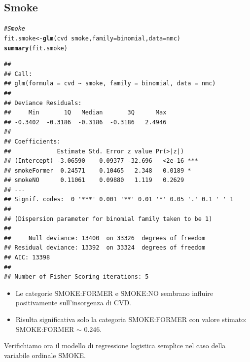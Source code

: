 \documentclass{article}\usepackage[]{graphicx}\usepackage[]{xcolor}
\makeatletter
\newcommand{\hlcom}[1]{\textcolor[rgb]{0.678,0.584,0.686}{\textit{#1}}}%
\newcommand{\hlopt}[1]{\textcolor[rgb]{0,0,0}{#1}}%
\newcommand{\hlstd}[1]{\textcolor[rgb]{0.345,0.345,0.345}{#1}}%
\newcommand{\hlkwb}[1]{\textcolor[rgb]{0.69,0.353,0.396}{#1}}%
\newcommand{\hlkwc}[1]{\textcolor[rgb]{0.333,0.667,0.333}{#1}}%
\newcommand{\hlkwd}[1]{\textcolor[rgb]{0.737,0.353,0.396}{\textbf{#1}}}%
\newenvironment{kframe}{%
 \def\at@end@of@kframe{}%
 \ifinner\ifhmode%
  \def\at@end@of@kframe{\end{minipage}}%
  \begin{minipage}{\columnwidth}%
 \fi\fi%
 \def\FrameCommand##1{\hskip\@totalleftmargin \hskip-\fboxsep
 \colorbox{shadecolor}{##1}\hskip-\fboxsep
     \hskip-\linewidth \hskip-\@totalleftmargin \hskip\columnwidth}%
 \MakeFramed {\advance\hsize-\width
   \@totalleftmargin\z@ \linewidth\hsize
   \@setminipage}}%
 {\par\unskip\endMakeFramed%
 \at@end@of@kframe}
\newenvironment{knitrout}{}{} %
\makeatother
\begin{document}
  \subsection{Smoke}  
\begin{knitrout}
\color{fgcolor}\begin{kframe}
\begin{alltt}
\hlcom{#Smoke}
\hlstd{fit.smoke} \hlkwb{<-} \hlkwd{glm}\hlstd{(cvd}\hlopt{~}\hlstd{smoke,} \hlkwc{family}\hlstd{=binomial,} \hlkwc{data}\hlstd{=nmc)}
\hlkwd{summary}\hlstd{(fit.smoke)}
\end{alltt}
\begin{verbatim}
## 
## Call:
## glm(formula = cvd ~ smoke, family = binomial, data = nmc)
## 
## Deviance Residuals: 
##     Min       1Q   Median       3Q      Max  
## -0.3402  -0.3186  -0.3186  -0.3186   2.4946  
## 
## Coefficients:
##             Estimate Std. Error z value Pr(>|z|)    
## (Intercept) -3.06590    0.09377 -32.696   <2e-16 ***
## smokeFormer  0.24571    0.10465   2.348   0.0189 *  
## smokeNO      0.11061    0.09880   1.119   0.2629    
## ---
## Signif. codes:  0 '***' 0.001 '**' 0.01 '*' 0.05 '.' 0.1 ' ' 1
## 
## (Dispersion parameter for binomial family taken to be 1)
## 
##     Null deviance: 13400  on 33326  degrees of freedom
## Residual deviance: 13392  on 33324  degrees of freedom
## AIC: 13398
## 
## Number of Fisher Scoring iterations: 5
\end{verbatim}
\end{kframe}
\end{knitrout}
  
    \begin{itemize}
      \item Le categorie SMOKE:FORMER e SMOKE:NO sembrano influire positivamente
            sull'insorgenza di CVD.
      \item Risulta significativa solo la categoria SMOKE:FORMER con valore stimato:
            SMOKE:FORMER $\sim$ 0.246.
    \end{itemize}
    
    Verifichiamo ora il modello di regressione logistica semplice nel caso della 
    variabile ordinale SMOKE.
    
\end{document}
